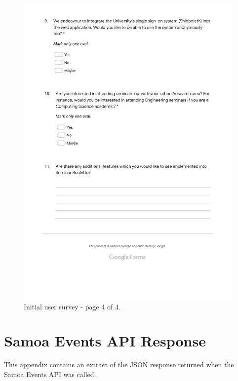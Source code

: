 \documentclass{l4proj}
\begin{document}
\begin{appendices}
\begin{figure}[htb]
    \centering
    \includegraphics[width=\linewidth]{images/initial_user_survey_4.pdf}    
    \caption{Initial user survey - page 4 of 4.}
    \label{fig:initial_user_survey_4} 
\end{figure}


\chapter{Samoa Events API Response}
\label{appendix:samoa_api_response}

This appendix contains an extract of the JSON response returned when the Samoa Events API was called.


\end{appendices}
\end{document}

